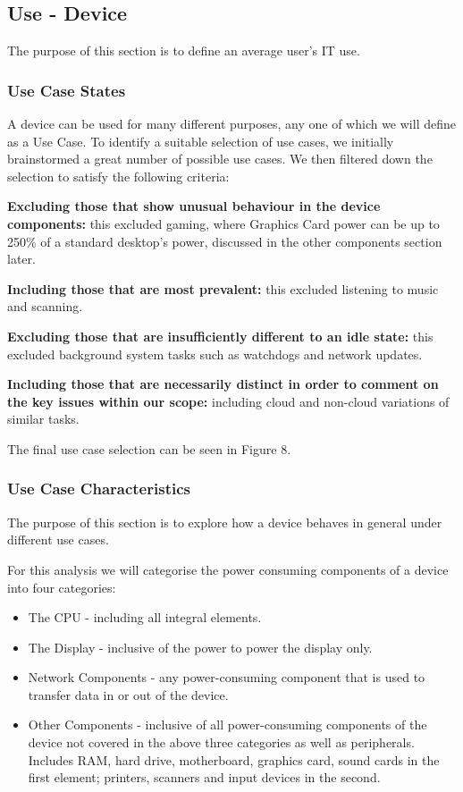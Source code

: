 \documentclass[conference]{IEEEtran}
\begin{document}
\subsection{Use - Device}

The purpose of this section is to define an average user’s IT use.

\subsubsection{Use Case States}

A device can be used for many different purposes, any one of which we will define as a Use Case.
To identify a suitable selection of use cases, we initially
brainstormed a great number of possible use cases. We then filtered
down the selection to satisfy the following criteria:

{\textbf{Excluding those that show unusual behaviour in the device
    components:}} this excluded gaming, where Graphics Card power can be up to 250\% of
a standard desktop’s power, discussed in the other components section
later.

{\textbf{Including those that are most prevalent:}} this excluded listening to
music and scanning.

{\textbf{Excluding those that are insufficiently different to an idle
    state:}} this excluded background system tasks such as watchdogs and network
updates.

{\textbf{Including those that are necessarily distinct in order to
    comment on the key issues within our scope:}} including cloud and
non-cloud variations of similar tasks.

The final use case selection can be seen in Figure 8.

\subsubsection{Use Case Characteristics}

The purpose of this section is to explore how a device behaves in general under different use cases.


For this analysis we will categorise the power consuming components of
a device into four categories:

\begin{itemize}
\item The CPU - including all integral elements.
\item The Display - inclusive of the power to power the display only.
\item Network Components - any power-consuming component that is used to transfer data in or out of the device.
\item Other Components - inclusive of all power-consuming components
  of the device not covered in the above three categories as well as
  peripherals. Includes RAM, hard drive, motherboard, graphics
  card, sound cards in the first element; printers, scanners and input
  devices in the second.
\end{itemize}
\end{document}

